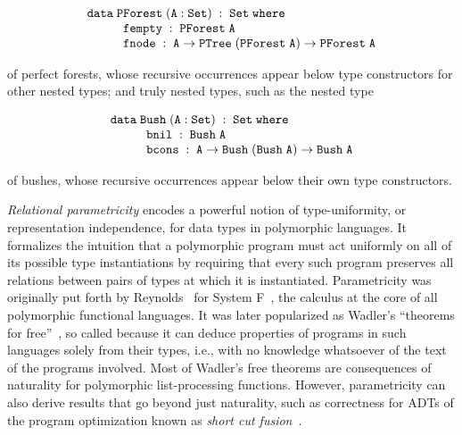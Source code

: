 \documentclass[runningheads]{llncs}
\begin{document}
\vspace*{-0.05in}

{\small
\[\begin{array}{l}
\mathtt{data\; PForest\;(A : Set)\;:\;Set\;where}\\
\hspace*{0.4in}\mathtt{fempty\;:\;PForest\;A}\\
\hspace*{0.4in}\mathtt{fnode\;:\; A \rightarrow PTree\;(PForest\;A) \to
PForest\;A}
\end{array}\]}

\vspace*{-0.05in}

\noindent
of perfect forests, whose recursive occurrences appear below type
constructors for other nested types; and truly nested types, such as
the nested type

\vspace*{-0.05in}

{\small
\[\begin{array}{l}
\mathtt{data\; Bush\;(A : Set)\;:\;Set\;where}\\
\hspace*{0.4in}\mathtt{bnil\;:\; Bush\;A}\\
\hspace*{0.4in}\mathtt{bcons\;:\;A \rightarrow Bush\;(Bush \; A)
  \rightarrow Bush\;A} 
\end{array}\]}

\vspace*{-0.05in}

\noindent
of bushes, whose recursive occurrences appear below their own type
constructors.

{\em Relational parametricity} encodes a powerful notion of
type-uniformity, or representation independence, for data types in
polymorphic languages. It formalizes the intuition that a polymorphic
program must act uniformly on all of its possible type instantiations
by requiring that every such program preserves all relations between
pairs of types at which it is instantiated. Parametricity was
originally put forth by Reynolds~\cite{rey83} for System
F~\cite{gir72}, the calculus at the core of all polymorphic functional
languages. It was later popularized as Wadler's ``theorems for
free''~\cite{wad89}, so called because it can deduce properties of
programs in such languages solely from their types, i.e., with no
knowledge whatsoever of the text of the programs involved.  Most of
Wadler's free theorems are consequences of naturality for polymorphic
list-processing functions. However, parametricity can also derive
results that go beyond just naturality, such as correctness for ADTs
of the program optimization known as {\em short cut
  fusion}~\cite{glp93,joh02}.
\end{document}
